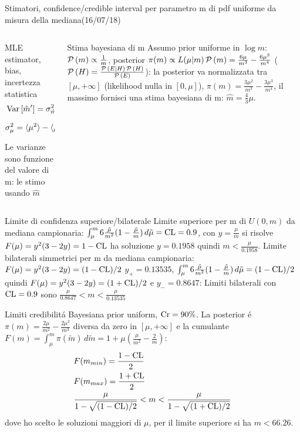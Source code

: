 \documentclass[asd-beamer.tex]{subfiles}
\begin{document}
\begin{frame}{Stimatori, confidence/credible interval per parametro m di pdf uniforme da misura della mediana(16/07/18)}
\begin{columns}[T]\begin{column}{0.5\textwidth}
\begin{block}{MLE estimator, bias, incertezza statistica}
\begin{align*}
&\operatorname{Var}{[\hat{m}']}=\sigma^2_{\hat{m}'}=4\operatorname{Var}{\mu}=4\sigma_{\mu}^2\\
&\sigma^2_{\mu}=\langle \mu^2 \rangle-\langle \mu \rangle^2=\frac{m^2}{20}
\end{align*}
Le varianze sono funzione del valore di m: le stimo usando $\hat{m}$
\end{block}
\end{column}\begin{column}{0.5\textwidth}
\begin{block}{Stima bayesiana di m}
Assumo prior uniforme in $\log{m}$: $\operatorname{\mathcal{P}}{(m)}\propto\frac{1}{m}$, posterior $\pi(m)\propto L(\mu|m)\operatorname{\mathcal{P}}{(m)}=\frac{6\mu}{m^3}-\frac{6\mu^2}{m^4}$ ($\operatorname{\mathcal{P}}{(H)}=\frac{\operatorname{\mathcal{P}}{(E|H)\operatorname{\mathcal{P}}{(H)}}}{\operatorname{\mathcal{P}}{(E)}}$): la posterior va normalizzata tra $[\mu,+\infty]$ (likelihood nulla  in $[0,\mu]$), $\pi(m)=\frac{3\mu^2}{m^3}-\frac{3\mu^3}{m^4}$, il massimo fornisci una stima bayesiana di m: $\hat{m}=\frac{4}{3}\mu$.
\end{block}
\end{column}\end{columns}
\end{frame}

\begin{frame}{Limite di confidenza superiore/bilaterale}
Limite superiore per m di $U(0,m)$ da mediana campionaria: $\int_{\mu}^m6\frac{\tilde{\mu}}{m^2}(1-\frac{\tilde{\mu}}{m})\,d\tilde{\mu}=\operatorname{CL}=0.9$, con $y=\frac{\mu}{m}$ si risolve $F(\mu)=y^2(3-2y)=1-\operatorname{CL}$ ha soluzione $y=0.1958$ quindi $m<\frac{\mu}{0.1958}$.
Limite bilaterali simmetrici per m da mediana campionaria: $F(\mu)=y^2(3-2y)=(1-\operatorname{CL})/2$ $y_+=0.13535$, $\int_{\mu}^m6\frac{\tilde{\mu}}{m^2}(1-\frac{\tilde{\mu}}{m})\,d\tilde{\mu}=(1-\operatorname{CL})/2$ quindi $F(\mu)=y^2(3-2y)=(1+\operatorname{CL})/2$ e $y_-=0.8647$: Limiti bilaterali con $\operatorname{CL}=0.9$ sono $\frac{\mu}{0.8647}<m<\frac{\mu}{0.13535}$
\end{frame}

\begin{frame}{Limiti credibilit\'a Bayesiana}
prior uniform, $\operatorname{Cr}=90\%$. La posterior \'e $\pi(m)=\frac{2\mu}{m^2}-\frac{2\mu^2}{m^3}$ diversa da zero in $[\mu,+\infty]$ e la cumulante $F(m)=\int_{\mu}^m\pi(\tilde{m})\,d\tilde{m}=1+\mu(\frac{\mu}{m^2}-\frac{2}{m})$:
\begin{align*}
&F(m_{min})=\frac{1-\operatorname{CL}}{2}\\
&F(m_{max})=\frac{1+\operatorname{CL}}{2}\\
&\frac{\mu}{1-\sqrt{(1-\operatorname{CL})/2}}<m<\frac{\mu}{1-\sqrt{(1+\operatorname{CL})/2}}
\end{align*}
dove ho scelto le soluzioni maggiori di $\mu$, per il limite superiore si ha $m<66.26$.
\end{frame}
\end{document}
